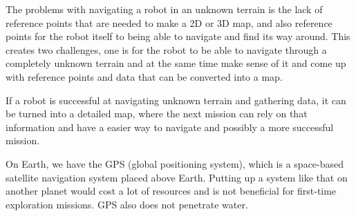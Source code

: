 The problems with navigating a robot in an unknown terrain is the lack of reference points that are needed to make a 2D or 3D map, and also reference points for the robot itself to being able to navigate and find its way around. This creates two challenges, one is for the robot to be able to navigate through a completely unknown terrain and at the same time make sense of it and come up with reference points and data that can be converted into a map.

If a robot is successful at navigating unknown terrain and gathering data, it can be turned into a detailed map, where the next mission can rely on that information and have a easier way to navigate and possibly a more successful mission. 

On Earth, we have the GPS (global positioning system), which is a space-based satellite navigation system placed above Earth\cite{gpsgeneral}. Putting up a system like that on another planet would cost a lot of resources and is not beneficial for first-time exploration missions. GPS also does not penetrate water\cite{underwatergps}. 
